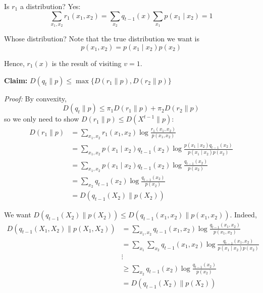 \documentclass[12pt]{report}
\newcommand*{\tbf}[1]{\ifmmode\mathbf{#1}\else\textbf{#1}\fi}
\newenvironment*{tbox}[2][gray]{
    \begin{tcolorbox}[
        parbox=false,
        colback=#1!5!white,
        colframe=#1!75!black,
        breakable,
        title={#2}
    ]}
    {\end{tcolorbox}}
\begin{document}
\begin{tbox}{\textbf{Claim:} Let $X^0, X^1, \dots$ be a Gibbs Sampler. Let $q_t$ be the distribution of $X^t$. Then $D(q_t \parallel p) \leq D(q_{t-1} \parallel p)$ for all $t$.}
	Is $r_1$ a distribution? Yes:
	\[\sum_{x_1, x_2} r_1(x_1, x_2) = \sum_{x_2} q_{t-1}(x) \sum_{x_1} p(x_1 \; | \; x_2) = 1\]

	Whose distribution? Note that the true distribution we want is
	\[p(x_1, x_2) = p(x_1 \; | \; x_2) p(x_2)\]

	Hence, $r_1(x)$ is the result of visiting $v = 1$.

	\tbf{Claim:} $D(q_t \parallel p ) \leq \max\{D(r_1 \parallel p), D(r_2 \parallel p)\}$

	\emph{Proof:} By convexity,
	\[D(q_t \parallel p) \leq \pi_1 D(r_1 \parallel p) + \pi_2 D(r_2\parallel p)\]
	so we only need to show $D(r_1 \parallel p) \leq D(X^{t-1}\parallel p)$:
	\begin{align*}
		D(r_1 \parallel p) & = \sum_{x_1, x_2} r_1(x_1, x_2) \log \frac{r_1(x_1, x_2)}{p(x_1, x_2)}                                                   \\
		                   & = \sum_{x_1, x_2} p(x_1 \; | \; x_2) q_{t-1}(x_2) \log \frac{p(x_1 \; | \; x_2) q_{t-1}(x_2)}{p(x_1 \; | \; x_2) p(x_2)} \\
		                   & = \sum_{x_1, x_2} p(x_1 \; | \; x_2) q_{t-1}(x_2) \log \frac{q_{t-1}(x_2)}{p(x_2)}                                       \\
		                   & = \sum_{x_2} q_{t-1}(x_2) \log \frac{q_{t-1}(x_2)}{p(x_2)}                                                               \\
		                   & = D(q_{t-1}(X_2) \parallel p(X_2))
	\end{align*}

	We want $D(q_{t-1}(X_2) \parallel p(X_2)) \leq D(q_{t-1}(x_1, x_2) \parallel p(x_1, x_2))$. Indeed,
	\begin{align*}
		D(q_{t-1}(X_1, X_2) \parallel p(X_1, X_2)) & = \sum_{x_1, x_2} q_{t-1}(x_1, x_2) \log \frac{q_{t-1}(x_1, x_2)}{p(x_1, x_2)}                     \\
		                                           & = \sum_{x_1} \sum_{x_2} q_{t-1}(x_1, x_2) \log \frac{q_{t-1}(x_1, x_2)}{p(x_1 \; | \; x_2) p(x_2)} \\
		                                           & \vdots                                                                                             \\
		                                           & \geq \sum_{x_2} q_{t-1}(x_2) \log \frac{q_{t-1}(x_2)}{p(x_2)}                                      \\
		                                           & = D(q_{t-1}(X_2) \parallel p(X_2))
	\end{align*}

\end{tbox}
\end{document}
